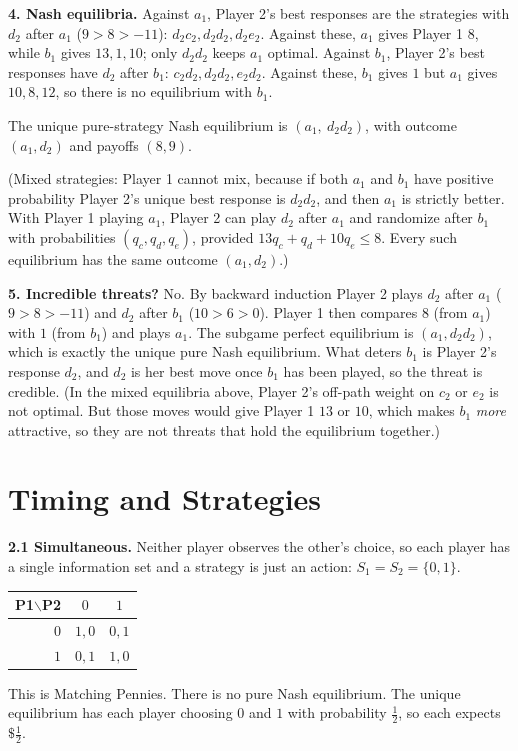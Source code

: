 \documentclass[11pt]{article}
\begin{document}
\textbf{4. Nash equilibria.} Against $a_1$, Player 2's best responses are the strategies with $d_2$ after $a_1$ ($9>8>-11$): $d_2c_2, d_2d_2, d_2e_2$. Against these, $a_1$ gives Player 1 $8$, while $b_1$ gives $13, 1, 10$; only $d_2d_2$ keeps $a_1$ optimal. Against $b_1$, Player 2's best responses have $d_2$ after $b_1$: $c_2d_2, d_2d_2, e_2d_2$. Against these, $b_1$ gives $1$ but $a_1$ gives $10, 8, 12$, so there is no equilibrium with $b_1$.

The unique pure-strategy Nash equilibrium is $(a_1,\ d_2d_2)$, with outcome $(a_1,d_2)$ and payoffs $(8,9)$.

(Mixed strategies: Player 1 cannot mix, because if both $a_1$ and $b_1$ have positive probability Player 2's unique best response is $d_2d_2$, and then $a_1$ is strictly better. With Player 1 playing $a_1$, Player 2 can play $d_2$ after $a_1$ and randomize after $b_1$ with probabilities $(q_c,q_d,q_e)$, provided $13q_c+q_d+10q_e\le 8$. Every such equilibrium has the same outcome $(a_1,d_2)$.)

\textbf{5. Incredible threats?} No. By backward induction Player 2 plays $d_2$ after $a_1$ ($9>8>-11$) and $d_2$ after $b_1$ ($10>6>0$). Player 1 then compares $8$ (from $a_1$) with $1$ (from $b_1$) and plays $a_1$. The subgame perfect equilibrium is $(a_1, d_2d_2)$, which is exactly the unique pure Nash equilibrium. What deters $b_1$ is Player 2's response $d_2$, and $d_2$ is her best move once $b_1$ has been played, so the threat is credible. (In the mixed equilibria above, Player 2's off-path weight on $c_2$ or $e_2$ is not optimal. But those moves would give Player 1 $13$ or $10$, which makes $b_1$ \emph{more} attractive, so they are not threats that hold the equilibrium together.)

\section{Timing and Strategies}

\textbf{2.1 Simultaneous.} Neither player observes the other's choice, so each player has a single information set and a strategy is just an action: $S_1=S_2=\{0,1\}$.
\begin{center}
\begin{tabular}{r|cc}
P1$\backslash$P2 & $0$ & $1$ \\ \hline
$0$ & $1,0$ & $0,1$ \\
$1$ & $0,1$ & $1,0$
\end{tabular}
\end{center}
This is Matching Pennies. There is no pure Nash equilibrium. The unique equilibrium has each player choosing $0$ and $1$ with probability $\tfrac12$, so each expects $\$\tfrac12$.
\end{document}
